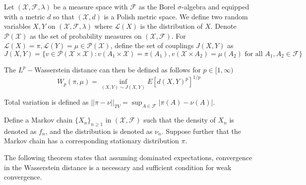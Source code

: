 \documentclass{article}
\theoremstyle{plain}%
\theoremstyle{definition}
\theoremstyle{remark}
\begin{document}
	Let $(\mathcal{X},\mathcal{F}, \lambda)$ be a measure space with $\mathcal{F}$ as the Borel $\sigma$-algebra and equipped with a metric $d$ so that $(\mathcal{X},d)$ is a Polish metric space.
	We define two random variables $X,Y$ on $(\mathcal{X}, \mathcal{F}, \lambda)$ where $\mathcal{L}(X)$ is the distribution of $X$. 
	Denote $\mathcal{P}(\mathcal{X})$ as the set of probability measures on $(\mathcal{X},\mathcal{F})$. For $\mathcal{L}(X)=\pi,\mathcal{L}(Y)=\mu\in \mathcal{P}(\mathcal{X})$, define the set of couplings $J(X,Y)$ as 
	$$J(X,Y)=\{v\in \mathcal{P}(\mathcal{X}\times \mathcal{X}): v(A_1\times \mathcal{X})=\pi(A_1), v(\mathcal{X}\times A_2)=\mu(A_2) \text{ for all } A_1,A_2\in \mathcal{F}\}$$
	
	
	The $L^p-$Wasserstein distance can then be defined as follows for $p\in [1,\infty)$
	$$W_p(\pi,\mu)=\inf_{(X,Y)\sim J(X,Y)}E[d(X,Y)^p]^{1/p}$$
	
	Total variation is defined as $||\pi-\nu||_{TV}=\sup_{A\in \mathcal{F}}|\pi(A)-\nu(A)|$.
	
	
	Define a Markov chain $\{X_n\}_{n\geq 1}$ in $(\mathcal{X},\mathcal{F})$ such that the density of $X_n$ is denoted as $f_n$, and the distribution is denoted as $\nu_n$. Suppose further that the Markov chain has a corresponding stationary distribution $\pi$. 
	
	The following theorem states that assuming dominated expectations, convergence in the Wasserstein distance is a necessary and sufficient condition for weak convergence. 
	
\end{document}
